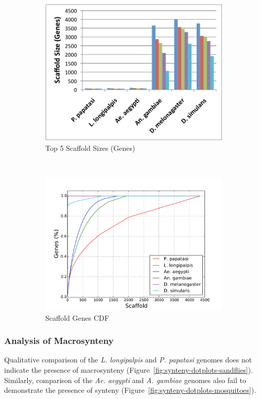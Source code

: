 \begin{figure}[H]
\begin{subfigure}[b]{0.45\textwidth}
    \includegraphics[width=\textwidth]{figures/synteny/top5_scaffold_sizes.pdf}
    \caption{Top 5 Scaffold Sizes (Genes)}
  \end{subfigure}
  ~
  \begin{subfigure}[b]{0.45\textwidth}
    \includegraphics[width=\textwidth]{figures/synteny/gene_scaffold_cdf.pdf}
    \caption{Scaffold Genes CDF}
  \end{subfigure}
  \label{fig:scaffolds}
  \caption{}
\end{figure}

\subsubsection{Analysis of Macrosynteny}
Qualitative comparison of the \emph{L. longipalpis} and \emph{P. papatasi} genomes does not indicate the presence of macrosynteny (Figure~\ref{fig:synteny-dotplots-sandflies}).  Similarly, comparison of the \emph{Ae. aegypti} and \emph{A. gambiae} genomes also fail to demonstrate the presence of synteny (Figure~\ref{fig:synteny-dotplots-mosquitoes}).

